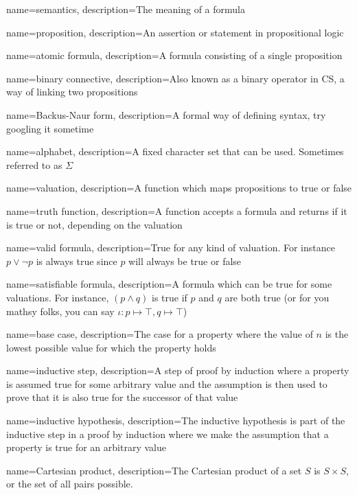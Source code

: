 {
    name={semantics},
    description={The meaning of a formula}
}

{
    name={proposition},
    description={An assertion or statement in propositional logic}
}

{
    name={atomic formula},
    description={A formula consisting of a single proposition}
}

{
    name={binary connective},
    description={Also known as a binary operator in CS, a way of linking two propositions}
}

{
    name={Backus-Naur form},
    description={A formal way of defining syntax, try googling it sometime}
}

{
    name={alphabet},
    description={A fixed character set that can be used. Sometimes referred to as $\Sigma$}
}

{
    name={valuation},
    description={A function which maps propositions to true or false}
}

{
    name={truth function},
    description={A function accepts a formula and returns if it is true or not, depending on the valuation}
}

{
    name={valid formula},
    description={True for any kind of valuation. For instance $p \lor \neg p$ is always true since $p$ will always be true or false}
}

{
    name={satisfiable formula},
    description={A formula which can be true for some valuations. For instance, $(p \land q)$ is true if $p$ and $q$ are both true (or for you mathsy folks, you can say $\iota: p \mapsto \top, q \mapsto \top$)}
}

{
    name={base case},
    description={The case for a property where the value of $n$ is the lowest possible value for which the property holds}
}

{
    name={inductive step},
    description={A step of proof by induction where a property is assumed true for some arbitrary value and the assumption is then used to prove that it is also true for the successor of that value}
}

{
    name={inductive hypothesis},
    description={The inductive hypothesis is part of the inductive step in a proof by induction where we make the assumption that a property is true for an arbitrary value}
}

{
    name={Cartesian product},
    description={The Cartesian product of a set $S$ is $S \times S$, or the set of all pairs possible.}
}
